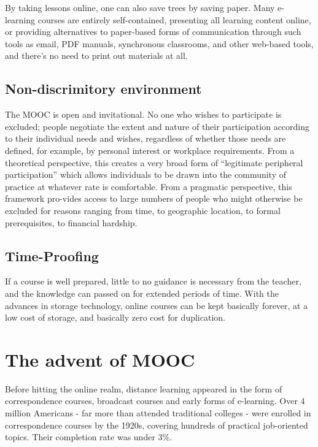 By taking lessons online, one can also save trees by saving paper. Many
e-learning courses are entirely self-contained, presenting all learning content
online, or providing alternatives to paper-based forms of communication through
such tools as email, PDF manuals, synchronous classrooms, and other web-based
tools, and there's no need to print out materials at all.

\subsection{Non-discrimitory environment}
The MOOC is open and invitational. No one who wishes to participate is excluded;
people negotiate the extent and nature of their participation according to their
individual needs and wishes, regardless of whether those needs are defined, for
example, by personal interest or workplace requirements. From a theoretical
perspective, this creates a very broad form of “legitimate peripheral
participation”\citep{wegner} which allows individuals to be drawn into the
community of practice at whatever rate is comfortable. From a pragmatic
perspective, this framework pro-vides access to large numbers of people who
might otherwise be excluded for reasons ranging from time, to geographic
location, to formal prerequisites, to financial hardship\citep{wegner}.

\subsection{Time-Proofing}
If a course is well prepared, little to no guidance is necessary from the
teacher, and the knowledge can passed on for extended periods of time. With the
advances in storage technology, online courses can be kept basically forever, at
a low cost of storage, and basically zero cost for duplication.

\section{The advent of MOOC}
Before hitting the online realm, distance learning appeared in the form of
correspondence courses, broadcast courses and early forms of
e-learning\citep{history_of_instr_tech}. Over 4 million Americans
- far more than attended traditional colleges - were enrolled in correspondence
courses by the 1920s, covering hundreds of practical job-oriented topics. Their
completion rate was under 3\%\citep{pursuit_of_knowledge}.

